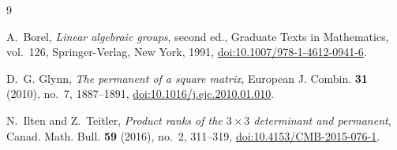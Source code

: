 \documentclass[11pt]{amsart}
\theoremstyle{definition}
\begin{document}
\begin{thebibliography}{9}

A.~Borel,
\emph{Linear algebraic groups}, second ed., Graduate Texts in Mathematics,
vol.~126, Springer-Verlag, New York, 1991,
\href{https://doi.org/10.1007/978-1-4612-0941-6}
{doi:10.1007/978-1-4612-0941-6}.

D.~G. Glynn,
\emph{The permanent of a square matrix},
European J. Combin. \textbf{31} (2010), no.~7, 1887--1891,
\href{https://doi.org/10.1016/j.ejc.2010.01.010}
{doi:10.1016/j.ejc.2010.01.010}.

N.~Ilten and Z.~Teitler,
\emph{Product ranks of the \(3\times3\) determinant and permanent},
Canad. Math. Bull. \textbf{59} (2016), no.~2, 311--319,
\href{https://doi.org/10.4153/CMB-2015-076-1}
{doi:10.4153/CMB-2015-076-1}.

\end{thebibliography}
\end{document}
